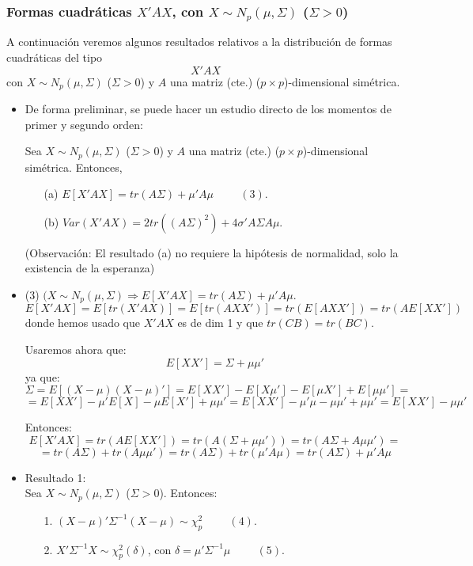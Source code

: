 \documentclass[11pt,a4paper]{article}
\begin{document}
\subsubsection{Formas cuadráticas \texorpdfstring{$X'AX$}), con \texorpdfstring{$X \sim N_{p}(\mu, \Sigma)$}) (\texorpdfstring{$\Sigma > 0$}))}
A continuación veremos algunos resultados relativos a la distribución de formas cuadráticas del tipo
$$X'AX$$
con $X \sim N_{p}(\mu, \Sigma)$ ($\Sigma > 0$) y $A$ una matriz (cte.) ($p \times p$)-dimensional simétrica.

\begin{itemize}
\item De forma preliminar, se puede hacer un estudio directo de los momentos de primer y segundo orden:

Sea $X \sim N_{p}(\mu,\Sigma)$ ($\Sigma > 0$) y $A$ una matriz (cte.) ($p \times p$)-dimensional simétrica. Entonces,
\begin{itemize}
\item[(a)] $E[X'AX] = tr(A\Sigma) + \mu'A\mu \hspace{1cm} (3)$.
\item[(b)] $Var(X'AX) = 2tr((A\Sigma)^{2}) + 4 \sigma'A\Sigma A\mu$.
\end{itemize}
(Observación: El resultado (a) no requiere la hipótesis de normalidad, solo la existencia de la esperanza)

\item (3) $(X \sim N_{p}(\mu, \Sigma) \Rightarrow E[X'AX] = tr(A\Sigma) + \mu'A\mu$.
$$E[X'AX] = E[tr(X'AX)] = E[tr(AXX')] = tr(E[AXX']) = tr(A E[XX'])$$
donde hemos usado que $X'AX$ es de dim 1 y que $tr(CB) = tr(BC)$.

Usaremos ahora que:
$$E[XX'] = \Sigma + \mu\mu'$$
ya que:
$$\Sigma = E[(X-\mu)(X-\mu)'] = E[XX'] - E[X\mu'] - E[\mu X'] + E[\mu\mu'] =$$
$$= E[XX'] - \mu'E[X] - \mu E[X'] + \mu\mu' = E[XX'] - \mu'\mu - \mu\mu' + \mu\mu' = E[XX'] - \mu\mu'$$

Entonces:
$$E[X'AX] = tr(A E[XX']) = tr(A(\Sigma+\mu\mu')) = tr(A\Sigma + A\mu\mu') =$$
$$= tr(A\Sigma) + tr(A\mu\mu') = tr(A\Sigma) + tr(\mu'A\mu) = tr(A\Sigma) + \mu'A\mu$$

\item Resultado 1: \\
Sea $X \sim N_{p}(\mu, \Sigma)$ ($\Sigma > 0$). Entonces:
\begin{itemize}
\item[1.] $(X - \mu)' \Sigma^{-1} (X - \mu) \sim \chi_{p}^{2} \hspace{1cm} (4)$.
\item[2.] $X'\Sigma^{-1}X \sim \chi_{p}^{2}(\delta)$, con $\delta = \mu'\Sigma^{-1}\mu \hspace{1cm} (5)$.
\end{itemize}


\end{itemize}
\end{document}
